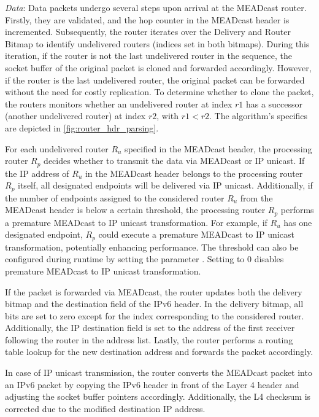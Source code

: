 \textit{Data}: Data packets undergo several steps upon arrival at the MEADcast
    router.
Firstly, they are validated, and the hop counter in the MEADcast header is
    incremented.
Subsequently, the router iterates over the Delivery and Router Bitmap to
    identify undelivered routers (indices set in both bitmaps).
During this iteration, if the router is not the last undelivered router in the
    sequence, the socket buffer of the original packet is cloned and forwarded
    accordingly.
However, if the router is the last undelivered router, the original packet can
    be forwarded without the need for costly replication.
To determine whether to clone the packet, the routers monitors whether an 
    undelivered router at index $r1$ has a successor (another undelivered
    router) at index $r2$, with $r1 < r2$.
The algorithm's specifics are depicted in \autoref{fig:router_hdr_parsing}.

For each undelivered router $R_u$ specified in the MEADcast header, the
    processing router $R_p$ decides whether to transmit the data via MEADcast
    or IP unicast.
If the IP address of $R_u$ in the MEADcast header belongs to the processing
    router $R_p$ itself, all designated endpoints will be delivered via IP
    unicast.
Additionally, if the number of endpoints assigned to the considered router
    $R_u$ from the MEADcast header is below a certain threshold, the processing
    router $R_p$ performs a premature MEADcast to IP unicast transformation.
For example, if $R_u$ has one designated endpoint, $R_p$ could execute a
    premature MEADcast to IP unicast transformation, potentially enhancing
    performance.
The threshold can also be configured during runtime by setting the parameter
    .
Setting  to 0 disables premature MEADcast to IP unicast
    transformation.

If the packet is forwarded via MEADcast, the router updates both the delivery
    bitmap and the destination field of the IPv6 header.
In the delivery bitmap, all bits are set to zero except for the index
    corresponding to the considered router.
Additionally, the IP destination field is set to the address of the first
    receiver following the router in the address list.
Lastly, the router performs a routing table lookup for the new destination
    address and forwards the packet accordingly.

In case of IP unicast transmission, the router converts the MEADcast packet
    into an IPv6 packet by copying the IPv6 header in front of the Layer 4
    header and adjusting the socket buffer pointers accordingly.
Additionally, the L4 checksum is corrected due to the modified destination IP
    address.

